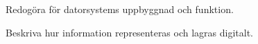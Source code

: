 \item Redogöra för datorsystems uppbyggnad och funktion.
\item Beskriva hur information representeras och lagras digitalt.
